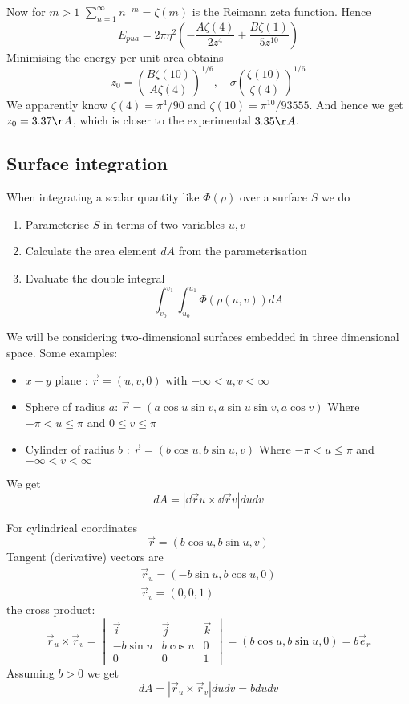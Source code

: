 \documentclass{E:/Documents/Latex/myassignment}
\begin{document}
Now for $m>1$ $\sum_{n=1}^\infty n^{-m} = \zeta(m)$ is the Reimann zeta function. Hence
\[E_{pua} = 2\pi\eta^2 \left(- \frac{A\zeta(4)}{2z^4} + \frac{B\zeta(1)}{5z^{10}}\right)\] 
Minimising the energy per unit area obtains
\[z_0 = \left(\frac{B\zeta(10)}{A\zeta(4)}\right)^{1/6}, \quad \sigma \left(\frac{\zeta(10)}{\zeta(4)}\right)^{1/6}\]
We apparently know $\zeta(4) = \pi^4/90$ and $\zeta(10) = \pi^{10}/93555$.
And hence we get $z_0 = 3.37 \AA$, which is closer to the experimental $3.35\AA$.

\subsection{Surface integration}
When integrating a scalar quantity like $\Phi(\rho)$ over a surface $S$ we do
\begin{enumerate}
	\item Parameterise $S$ in terms of two variables $u,v$
	\item Calculate the area element $dA$ from the parameterisation
	\item Evaluate the double integral
	\[\int_{v_0}^{v_1} \int_{u_0}^{u_1} \Phi(\rho(u,v)) dA\]
\end{enumerate}

We will be considering two-dimensional surfaces embedded in three dimensional space. Some examples:
\begin{itemize}
	\item $x-y$ plane : $\vec r = (u,v,0)$ with $-\infty < u,v < \infty$
	\item Sphere of radius $a$: $\vec r =(a\cos u \sin v, a\sin u \sin v, a \cos v)$
	Where $-\pi < u \leq \pi$ and $0\leq v \leq \pi$
	\item Cylinder of radius $b$ : $\vec r = (b\cos u, b\sin u,v)$
	Where $-\pi < u \leq \pi$ and $-\infty < v < \infty$
\end{itemize}

We get
\[dA = \left|\dd{\vec r}{u} \times \dd{\vec r}{v}\right| du dv\]


For cylindrical coordinates
\[\vec r = (b\cos u, b \sin u, v)\]
Tangent (derivative) vectors are 
\begin{align*}
	\vec r_u = (-b\sin u, b\cos u,0)\\
	\vec r_v = (0,0,1)
\end{align*}
the cross product:
\[\vec r_u \times \vec r_v = \begin{vmatrix}
	\vec i&\vec j&\vec k\\
	-b\sin u &b \cos u & 0\\
	0&0&1
\end{vmatrix} = (b\cos u, b\sin u,0) = b\vec e_r\]
Assuming $b>0$ we get
\[dA = |\vec r_u \times \vec r_v| du dv = b du dv\]
\end{document}
